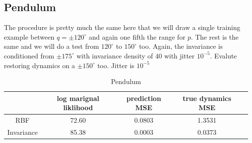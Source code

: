 \documentclass{statsmsc}
\begin{document}
\subsection{Pendulum}
The procedure is pretty much the same here that we will draw a single training example between $q=\pm 120^{\circ}$ and again one fifth the range for $p$.
The rest is the same and we will do a test from $120^{\circ}$ to $150^{\circ}$ too.
Again, the invariance is conditioned from $\pm 175^{\circ}$ with invariance density of 40 with jitter $10^{-5}$.
Evalute restoring dynamics on a $\pm 150^{\circ}$ too.
Jitter is $10^{-5}$
\begin{table}[H]
  \centering
  \begin{tabular}{ c c c c c}
    \hline
                    & log marignal liklihood &  prediction MSE & true dynamics MSE\\
                    \hline
RBF & 72.60 & 0.0803  & 1.3531 \\
Invariance & 85.38 & 0.0003 & 0.0373 \\
    \hline
  \end{tabular}
  \caption{Pendulum }
  \label{tab:pendulum_performance}
\end{table}
\end{document}

